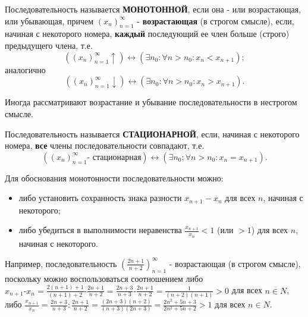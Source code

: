 \Large

{ 

  \indent Последовательность называется \textbf{МОНОТОННОЙ}, если она -
  или возрастающая, или убывающая, причем $(x_n)_{n=1}^{\infty}$ -
  \textbf{возрастающая} (в строгом смысле), если, начиная с некоторого
  номера, \textbf{каждый} последующий ее член больше (строго)
  предыдущего члена, т.е.
  \begin{equation*}
    ((x_n)_{n=1}^{\infty} \uparrow) \leftrightarrow
    (\exists n_0 : \forall n > n_0 : x_n < x_{n+1});
  \end{equation*}
  аналогично
  \begin{equation*}
    ((x_n)_{n=1}^{\infty} \downarrow) \leftrightarrow
    (\exists n_0 : \forall n > n_0 : x_n > x_{n+1}).
  \end{equation*}

  Иногда рассматривают возрастание и убывание
  последовательности в нестрогом смысле.

  Последовательность называется \textbf{СТАЦИОНАРНОЙ}, если,
  начиная с некоторого номера, \textbf{все} члены последовательности
  совпадают, т.е.
  \begin{equation*}
    ((x_n)_{n=1}^{\infty} \text{- стационарная}) \leftrightarrow
    (\exists n_0; \forall n > n_0 : x_n = x_{n + 1}).
  \end{equation*}

  Для обоснования монотонности последовательности можно:
  \begin{itemize}
    \item либо установить сохранность знака разности $x_{n+1} - x_n$ для всех $n$, начиная с некоторого;
    \item  либо убедиться в выполнимости неравенства $\frac{x_{n+1}}{x_n} < 1$ (или $>1$)
    для всех $n$, начиная с некоторого.
  \end{itemize}
}
Например, последовательность $(\frac{2n+1}{n+2})_{n=1}^{\infty}$ - возрастающая
(в строгом смысле), поскольку можно воспользоваться соотношением
либо 
$x_{n+1} \text{-} x_n = 
\frac{2(n+1)+1}{(n+1)+2} \text{-} \frac{2n+1}{n+2} = 
\frac{2n+3}{n+3} \text{-} \frac{2n+1}{n+2} = 
\frac{1}{(n+2)(n+1)} > 0$ для всех $n \in N$,
либо 
$\frac{x_{n+1}}{x_n} = 
\frac{2n+3}{n+3} : \frac{2n+1}{n+2} =
\frac{(2n+3)(n+2)}{(n+3)(2n+3)} =
\frac{2n^2+5n+3}{2n^2+5n+2} > 1$ для всех
$n \in N$.
